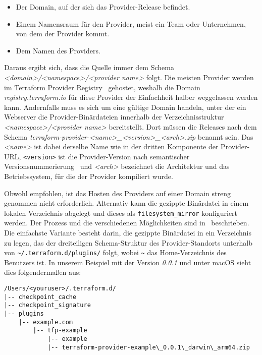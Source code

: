 \documentclass[paper=a4,11pt,numbers=noenddot]{article}
\begin{document}
\begin{itemize}
\item Der Domain, auf der sich das Provider-Release befindet.
\item Einem Namensraum für den Provider, meist ein Team oder Unternehmen, von dem der Provider kommt.
\item Dem Namen des Providers.
\end{itemize}

Daraus ergibt sich, dass die Quelle immer dem Schema \emph{<domain>/<namespace>/<provider name>} folgt. Die meisten Provider werden im Terraform Provider Registry~\autocite{noauthor_terraform_registry_nodate} gehostet, weshalb die Domain \emph{registry.terraform.io} für diese Provider der Einfachheit halber weggelassen werden kann. Andernfalls muss es sich um eine gültige Domain handeln, unter der ein Webserver die Provider-Binärdateien innerhalb der Verzeichnisstruktur \emph{<namespace>/<provider name>} bereitstellt. Dort müssen die Releases nach dem Schema \emph{terraform-provider-<name>\_<version>\_<arch>.zip} benannt sein. Das \emph{<name>} ist dabei derselbe Name wie in der dritten Komponente der Provider-URL, \verb'<version>' ist die Provider-Version nach semantischer Versionsnummerierung~\autocite{preston-werner_semantic_versioning_nodate} und \emph{<arch>} bezeichnet die Architektur und das Betriebssystem, für die der Provider kompiliert wurde.

Obwohl empfohlen, ist das Hosten des Providers auf einer Domain streng genommen nicht erforderlich. Alternativ kann die gezippte Binärdatei in einem lokalen Verzeichnis abgelegt und dieses als \verb'filesystem_mirror' konfiguriert werden. Der Prozess und die verschiedenen Möglichkeiten sind in~\autocite{noauthor_terraform_provider_installation_nodate} beschrieben. Die einfachste Variante besteht darin, die gezippte Binärdatei in ein Verzeichnis zu legen, das der dreiteiligen Schema-Struktur des Provider-Standorts unterhalb von \verb'~/.terraform.d/plugins/' folgt, wobei \verb'~' das Home-Verzeichnis des Benutzers ist. In unserem Beispiel mit der Version \emph{0.0.1} und unter macOS sieht dies folgendermaßen aus:

\begin{lstlisting}
/Users/<youruser>/.terraform.d/
|-- checkpoint_cache
|-- checkpoint_signature
|-- plugins
    |-- example.com
        |-- tfp-example
            |-- example
            |-- terraform-provider-example\_0.0.1\_darwin\_arm64.zip
\end{lstlisting}
\end{document}
